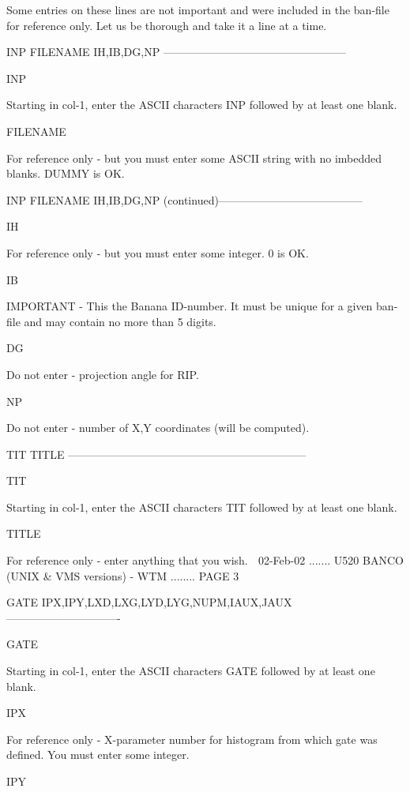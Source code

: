           Some entries on these lines are not important and were  included  in
          the  ban-file  for  reference only. Let us be thorough and take it a
          line at a time.
 
   INP FILENAME IH,IB,DG,NP --------------------------------------------------
 
   INP
 
   Starting in col-1, enter the ASCII characters INP followed by at least  one
   blank.
 
   FILENAME
 
   For  reference only - but you must enter some ASCII string with no imbedded
   blanks. DUMMY is OK.
 
   INP FILENAME IH,IB,DG,NP (continued)---------------------------------------
 
   IH
 
   For reference only - but you must enter some integer. 0 is OK.
 
   IB
 
   IMPORTANT - This the Banana ID-number.  It  must  be  unique  for  a  given
   ban-file and may contain no more than 5 digits.
 
   DG
 
   Do not enter - projection angle for RIP.
 
   NP
 
   Do not enter - number of X,Y coordinates (will be computed).
 
   TIT TITLE -----------------------------------------------------------------
 
   TIT
 
   Starting  in col-1, enter the ASCII characters TIT followed by at least one
   blank.
 
   TITLE
 
   For reference only - enter anything that you wish.
    
   02-Feb-02 ....... U520  BANCO (UNIX & VMS versions) - WTM ........ PAGE   3
 
 
   GATE IPX,IPY,LXD,LXG,LYD,LYG,NUPM,IAUX,JAUX -------------------------------
 
   GATE
 
   Starting in col-1, enter the ASCII characters GATE  followed  by  at  least
   one blank.
 
   IPX
 
   For  reference  only - X-parameter number for histogram from which gate was
   defined. You must enter some integer.
 
   IPY
 
